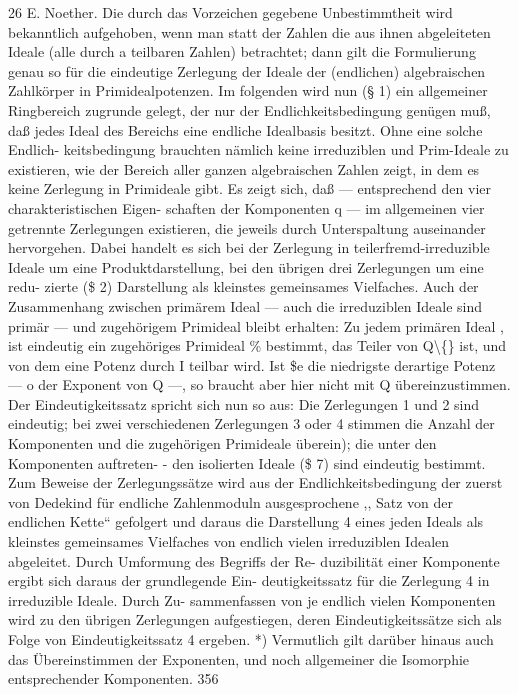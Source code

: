 \documentclass[11pt,a4paper]{article}
\theoremstyle{plain}
\theoremstyle{definition}
\begin{document}
26 
E. Noether. 
Die durch das Vorzeichen gegebene Unbestimmtheit wird bekanntlich 
aufgehoben, wenn man statt der Zahlen die aus ihnen abgeleiteten Ideale 
(alle durch a teilbaren Zahlen) betrachtet; 
dann gilt die Formulierung 
genau so für die eindeutige Zerlegung der Ideale der (endlichen) algebraischen 
Zahlkörper in Primidealpotenzen. 
Im folgenden wird nun (\S{} 1) ein allgemeiner Ringbereich zugrunde 
gelegt, der nur der Endlichkeitsbedingung genügen muß, daß jedes Ideal 
des Bereichs eine endliche Idealbasis besitzt. 
Ohne eine solche Endlich- 
keitsbedingung brauchten nämlich keine irreduziblen und Prim-Ideale zu 
existieren, 
wie der Bereich aller ganzen algebraischen Zahlen 
zeigt, in 
dem es keine Zerlegung in Primideale gibt. 
Es zeigt sich, daß --- entsprechend den vier charakteristischen Eigen- 
schaften der Komponenten q --- im allgemeinen vier getrennte Zerlegungen 
existieren, die jeweils durch Unterspaltung auseinander hervorgehen. Dabei 
handelt 
es 
sich bei der Zerlegung in teilerfremd-irreduzible Ideale um 
eine Produktdarstellung, bei den übrigen drei Zerlegungen um eine redu- 
zierte (\$ 2) Darstellung als kleinstes gemeinsames Vielfaches. 
Auch der 
Zusammenhang zwischen primärem Ideal --- 
auch die irreduziblen Ideale 
sind primär --- und zugehörigem Primideal 
bleibt 
erhalten: 
Zu jedem 
primären Ideal , ist eindeutig ein zugehöriges Primideal \% bestimmt, das 
Teiler von Q\textbackslash\{\} ist, und von dem eine Potenz durch I teilbar wird. 
Ist 
\$e die niedrigste derartige Potenz --- o der Exponent von Q ---, so braucht 
aber hier \textdegree{} nicht mit Q übereinzustimmen. 
Der Eindeutigkeitssatz spricht 
sich nun so aus: 
Die Zerlegungen 
1 und 2 sind eindeutig; 
bei zwei verschiedenen 
Zerlegungen 3 oder 4 stimmen 
die Anzahl der Komponenten und die 
zugehörigen Primideale überein); die unter den Komponenten auftreten- 
- 
den isolierten Ideale (\$ 7) sind eindeutig bestimmt. 
Zum Beweise der Zerlegungssätze wird aus der Endlichkeitsbedingung 
der zuerst von Dedekind für endliche Zahlenmoduln ausgesprochene ,, Satz 
von der endlichen Kette`` gefolgert und daraus die Darstellung 4 eines 
jeden Ideals 
als kleinstes gemeinsames Vielfaches 
von 
endlich 
vielen 
irreduziblen Idealen abgeleitet. 
Durch Umformung des Begriffs der Re- 
duzibilität 
einer Komponente ergibt sich daraus der grundlegende Ein- 
deutigkeitssatz für die Zerlegung 4 in irreduzible 
Ideale. 
Durch 
Zu- 
sammenfassen von 
je endlich vielen Komponenten wird zu 
den übrigen 
Zerlegungen 
aufgestiegen, 
deren Eindeutigkeitssätze 
sich als Folge von 
Eindeutigkeitssatz 4 ergeben. 
*) Vermutlich gilt darüber hinaus auch das Übereinstimmen der Exponenten, 
und noch allgemeiner die Isomorphie entsprechender Komponenten. 
356
\end{document}
